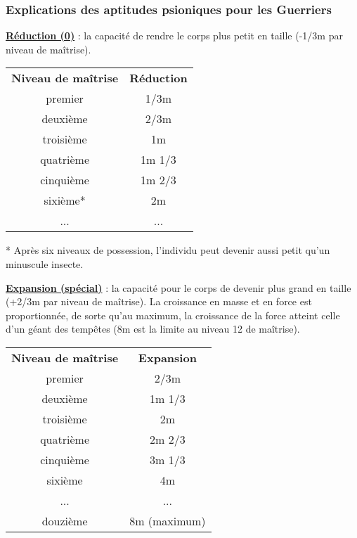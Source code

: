 \subsubsection*{Explications des aptitudes psioniques pour les Guerriers}

\label{guerrier-reduction}\textbf{\uline{Réduction (0)}} : la capacité de rendre le corps plus petit en taille (-1/3m par niveau de maîtrise).

\bigskip

\begin{tabular}{cc}
\textbf{Niveau de maîtrise} & \textbf{Réduction} \\
premier     & 1/3m \\
deuxième    & 2/3m \\
troisième   & 1m \\
quatrième   & 1m 1/3 \\
cinquième   & 1m 2/3 \\
sixième*    & 2m \\
...         & ... \\
\end{tabular}

\medskip

* Après six niveaux de possession, l'individu peut devenir aussi petit qu'un minuscule insecte.

\bigskip

\label{guerrier-expansion}\textbf{\uline{Expansion (spécial)}} : la capacité pour le corps de devenir plus grand en taille (+2/3m par niveau de maîtrise). La croissance en masse et en force est proportionnée, de sorte qu'au maximum, la croissance de la force atteint celle d'un géant des tempêtes (8m est la limite au niveau 12 de maîtrise).

\bigskip

\begin{tabular}{cc}
\textbf{Niveau de maîtrise} & \textbf{Expansion} \\
premier     & 2/3m \\
deuxième    & 1m 1/3 \\
troisième   & 2m \\
quatrième   & 2m 2/3 \\
cinquième   & 3m 1/3 \\
sixième     & 4m \\
...         & ... \\
douzième    & 8m (maximum) \\
\end{tabular}
\bigskip

